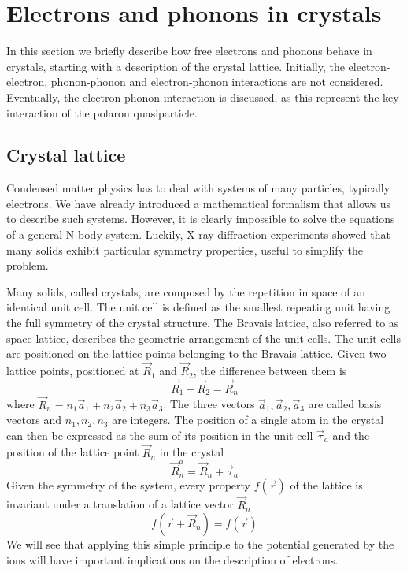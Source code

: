 \section{Electrons and phonons in crystals} \label{sec:electrons_phonons}
In this section we briefly describe how free electrons and phonons behave in crystals, starting with a description of the crystal lattice. Initially, the electron-electron, phonon-phonon and electron-phonon interactions are not considered. Eventually, the electron-phonon interaction is discussed, as this represent the key interaction of the polaron quasiparticle.
\subsection{Crystal lattice} \label{sec:crystals}
Condensed matter physics has to deal with systems of many particles, typically electrons. We have already introduced a mathematical formalism that allows us to describe such systems. However, it is clearly impossible to solve the equations of a general N-body system. Luckily, X-ray diffraction experiments showed that many solids exhibit particular symmetry properties, useful to simplify the problem.

Many solids, called crystals, are composed by the repetition in space of an identical unit cell. The unit cell is defined as the smallest repeating unit having the full symmetry of the crystal structure. The Bravais lattice, also referred to as space lattice, describes the geometric arrangement of the unit cells. The unit cells are positioned on the lattice points belonging to the Bravais lattice. Given  two lattice points, positioned at $\vec{R}_1$ and $\vec{R}_2$, the difference between them is
\begin{equation}
    \vec{R}_1 - \vec{R}_2 = \vec{R}_n
\end{equation}
where $\vec{R}_n = n_1\vec{a}_1 + n_2\vec{a}_2 + n_3\vec{a}_3$. The three vectors $\vec{a}_1, \vec{a}_2, \vec{a}_3$ are called basis vectors and $n_1, n_2, n_3$ are integers. The position of a single atom in the crystal can then be expressed as the sum of its position in the unit cell $\vec{\tau}_a$ and the position of the lattice point $\vec{R}_n$ in the crystal
\begin{equation}
    \vec{R}_n^a = \vec{R}_n + \vec{\tau}_a
\end{equation}
Given the symmetry of the system, every property $f(\vec{r})$ of the lattice is invariant under a translation of a lattice vector $\vec{R}_n$
\begin{equation} \label{eq:translational_invariance}
    f(\vec{r}+\vec{R}_n) = f(\vec{r})
\end{equation}
We will see that applying this simple principle to the potential generated by the ions will have important implications on the description of electrons.

